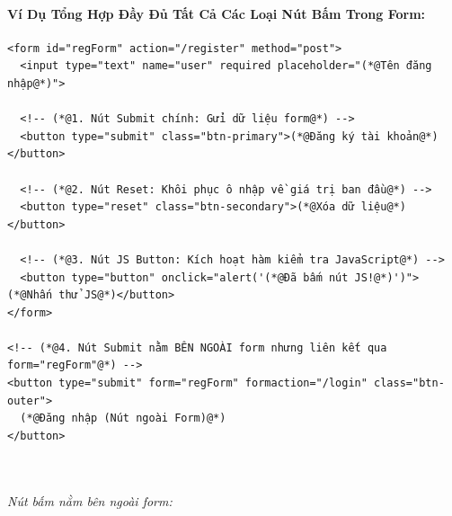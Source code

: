 \paragraph{Ví Dụ Tổng Hợp Đầy Đủ Tất Cả Các Loại Nút Bấm Trong Form:}

\begin{codeWindow}
\begin{lstlisting}[language=HTML5]
<form id="regForm" action="/register" method="post">
  <input type="text" name="user" required placeholder="(*@Tên đăng nhập@*)">
  
  <!-- (*@1. Nút Submit chính: Gửi dữ liệu form@*) -->
  <button type="submit" class="btn-primary">(*@Đăng ký tài khoản@*)</button>
  
  <!-- (*@2. Nút Reset: Khôi phục ô nhập về giá trị ban đầu@*) -->
  <button type="reset" class="btn-secondary">(*@Xóa dữ liệu@*)</button>
  
  <!-- (*@3. Nút JS Button: Kích hoạt hàm kiểm tra JavaScript@*) -->
  <button type="button" onclick="alert('(*@Đã bấm nút JS!@*)')">(*@Nhấn thử JS@*)</button>
</form>

<!-- (*@4. Nút Submit nằm BÊN NGOÀI form nhưng liên kết qua form="regForm"@*) -->
<button type="submit" form="regForm" formaction="/login" class="btn-outer">
  (*@Đăng nhập (Nút ngoài Form)@*)
</button>
\end{lstlisting}
\end{codeWindow}

\begin{browserWindow}
\sffamily\small
{} \\[6pt]
 \quad
{} \quad
{} \\[6pt]
\textcolor{codeComment}{\small\textit{Nút bấm nằm bên ngoài form:}} \quad
{}
\end{browserWindow}

